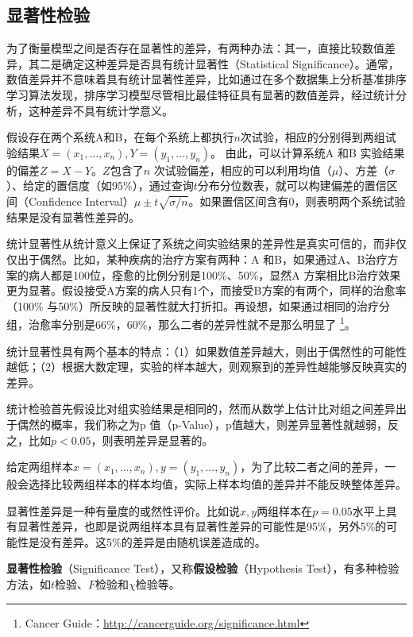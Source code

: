 \subsection{显著性检验}
为了衡量模型之间是否存在显著性的差异，有两种办法：其一，直接比较数值差异，其二是确定这种差异是否具有统计显著性（Statistical Significance）。通常，数值差异并不意味着具有统计显著性差异，比如\cite{gomes2013learning}通过在多个数据集上分析基准排序学习算法发现，排序学习模型尽管相比最佳特征具有显著的数值差异，经过统计分析，这种差异不具有统计学意义。

假设存在两个系统A和B，在每个系统上都执行$n$次试验，相应的分别得到两组试验结果$X = (x_1,\ldots, x_n), Y = (y_1,\ldots, y_n)$。 由此，可以计算系统A 和B 实验结果的偏差$Z = X - Y$。$Z$包含了$n$ 次试验偏差，相应的可以利用均值（$\mu$）、方差（$\sigma$）、给定的置信度（如95\%），通过查询$t$分布分位数表，就可以构建偏差的置信区间（Confidence Interval）$\mu \pm t \sqrt{\sigma/n}$。如果置信区间含有0，则表明两个系统试验结果是没有显著性差异的\cite{jain1991art}。

统计显著性从统计意义上保证了系统之间实验结果的差异性是真实可信的，而非仅仅出于偶然。比如，某种疾病的治疗方案有两种：A 和B，如果通过A、B治疗方案的病人都是100位，痊愈的比例分别是100\%、50\%，显然A 方案相比B治疗效果更为显著。假设接受A方案的病人只有1个，而接受B方案的有两个，同样的治愈率（100\% 与50\%）所反映的显著性就大打折扣。再设想，如果通过相同的治疗分组，治愈率分别是66\%，60\%，那么二者的差异性就不是那么明显了
\footnote{Cancer Guide：\href{http://cancerguide.org/significance.html}{http://cancerguide.org/significance.html}}。

统计显著性具有两个基本的特点：（1）如果数值差异越大，则出于偶然性的可能性越低；（2）根据大数定理，实验的样本越大，则观察到的差异性越能够反映真实的差异。

统计检验首先假设比对组实验结果是相同的，然而从数学上估计比对组之间差异出于偶然的概率，我们称之为p 值（p-Value），p值越大，则差异显著性就越弱，反之，比如$p<0.05$，则表明差异是显著的。

给定两组样本$x = (x_1,\ldots,x_n), y = (y_1,\ldots, y_n)$，为了比较二者之间的差异，一般会选择比较两组样本的样本均值，实际上样本均值的差异并不能反映整体差异。

显著性差异是一种有量度的或然性评价。比如说$x,y$两组样本在$p=0.05$水平上具有显著性差异，也即是说两组样本具有显著性差异的可能性是95\%，另外5\%的可能性是没有差异。这5\%的差异是由随机误差造成的。

\textbf{显著性检验}（Significance Test），又称\textbf{假设检验}（Hypothesis Test），有多种检验方法，如$t$检验、$F$检验和$\chi$检验等。

